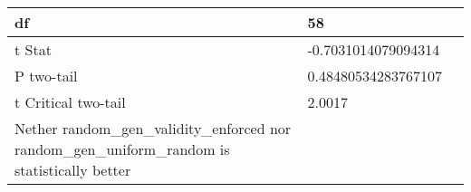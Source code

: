 \documentclass[11pt]{article}
\begin{document}
\begin{table}[]
{\begin{tabular}{|l|l|l|}
    df                                                                                              & 58                           &                                 \\ \hline
    t Stat                                                                                          & -0.7031014079094314          &                                 \\ \hline
    P two-tail                                                                                      & 0.48480534283767107          &                                 \\ \hline
    t Critical two-tail                                                                             & 2.0017                       &                                 \\ \hline
    Nether random\_gen\_validity\_enforced nor random\_gen\_uniform\_random is statistically better &                              &                                 \\ \hline
    \end{tabular}%
    }
\end{table}
\end{document}
